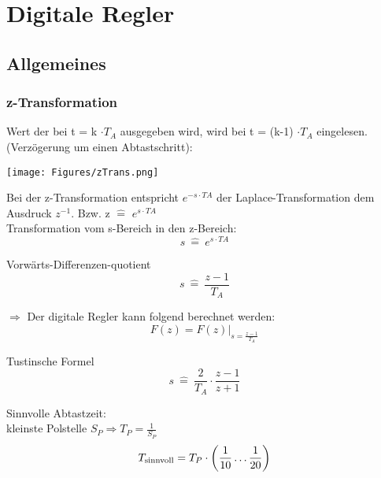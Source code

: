 \section{Digitale Regler}
\subsection{Allgemeines}
\subsubsection{z-Transformation}

Wert der bei t = k $\cdot T_A$ ausgegeben wird, wird bei t = (k-1) $\cdot T_A$
eingelesen. (Verzögerung um einen Abtastschritt):

\texttt{[image: Figures/zTrans.png]}

Bei der z-Transformation entspricht $e^{-s \cdot TA}$ der
Laplace-Transformation dem Ausdruck $z^{-1}$. Bzw. z $\hat{=}$ $e^{s \cdot
			TA}$\\ Transformation vom s-Bereich in den z-Bereich:
\[
	s \ \hat{=}\  e^{s \cdot TA}
\]

Vorwärts-Differenzen-quotient
\[
	s \ \hat{=} \ \frac{z-1}{T_A}
\]

$\Rightarrow$ Der digitale Regler kann folgend berechnet werden:
\[
	F(z) = F(z)|_{s= \frac {z-1}{T_A}}
\]

Tustinsche Formel
\[
	s \ \hat{=} \ \frac{2}{T_A} \cdot \frac{z-1}{z+1}
\]

Sinnvolle Abtastzeit:\\
kleinste Polstelle $S_P \Rightarrow T_P = \frac{1}{S_P}$
\[
	T_{\textnormal{sinnvoll}} = T_P \cdot \left(\frac{1}{10} \dots \frac{1}{20}\right)
\]